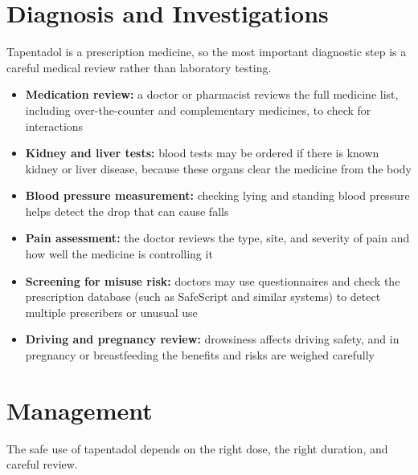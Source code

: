 \section*{Diagnosis and Investigations}
Tapentadol is a prescription medicine, so the most important diagnostic step is a careful medical review rather than laboratory testing.

\begin{itemize}
    \item \textbf{Medication review:} a doctor or pharmacist reviews the full medicine list, including over-the-counter and complementary medicines, to check for interactions
    \item \textbf{Kidney and liver tests:} blood tests may be ordered if there is known kidney or liver disease, because these organs clear the medicine from the body
    \item \textbf{Blood pressure measurement:} checking lying and standing blood pressure helps detect the drop that can cause falls
    \item \textbf{Pain assessment:} the doctor reviews the type, site, and severity of pain and how well the medicine is controlling it
    \item \textbf{Screening for misuse risk:} doctors may use questionnaires and check the prescription database (such as SafeScript and similar systems) to detect multiple prescribers or unusual use
    \item \textbf{Driving and pregnancy review:} drowsiness affects driving safety, and in pregnancy or breastfeeding the benefits and risks are weighed carefully
\end{itemize}

\section*{Management}
The safe use of tapentadol depends on the right dose, the right duration, and careful review.

